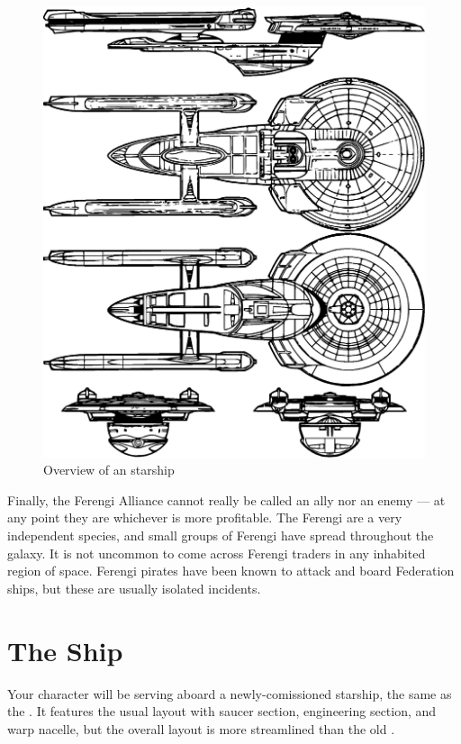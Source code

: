 \documentclass[12pt]{article}
\begin{document}
\begin{figure}
    \centering
    \includegraphics[width=0.8\linewidth]{img/ExcelsiorRefit.eps}\\
    \vspace{2ex}
    \footnotesize Overview of an  starship
    \vspace{-2em}
\end{figure}

Finally, the Ferengi Alliance cannot really be called an ally nor an enemy ---
at any point they are whichever is more profitable. The Ferengi are a very
independent species, and small groups of Ferengi have spread throughout the
galaxy. It is not uncommon to come across Ferengi traders in any inhabited
region of space. Ferengi pirates have been known to attack and board Federation
ships, but these are usually isolated incidents.

\section{The Ship}

Your character will be serving aboard a newly-comissioned 
starship, the same as the . It features the usual
layout with saucer section, engineering section, and warp nacelle, but the
overall layout is more streamlined than the old .
\end{document}
